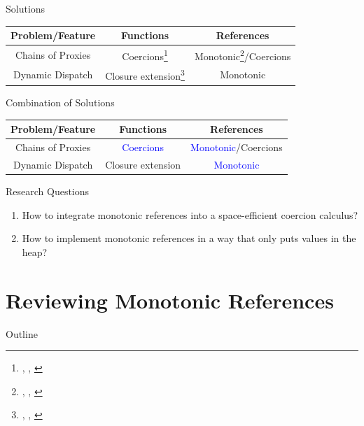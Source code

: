 \documentclass[12pt,dvipsnames]{beamer}
\newcommand{\customcite}[1]{\citeauthor{#1}, \citetitle{#1},
  \citeseries{#1} \citeyear{#1}}
\begin{document}
\begin{frame}[fragile]{Solutions}
  \begin{center}
  \begin{tabular}{|c|cc|}
    \hline
    Problem/Feature & Functions & References \\
    \hline
    Chains of Proxies & Coercions\footnote[frame]{\customcite{Siek:2015ab}} & Monotonic\footnote[frame]{\customcite{Siek:2015aa}}/Coercions \\
    Dynamic Dispatch & Closure extension\footnote[frame]{\customcite{Siek:2012uq}} & Monotonic \\
    \hline
  \end{tabular}
\end{center}
\end{frame}

\begin{frame}[fragile]{Combination of Solutions}
  \begin{center}
  \begin{tabular}{|c|cc|}
    \hline
    Problem/Feature & Functions & References \\
    \hline
    Chains of Proxies & \textcolor{blue}{Coercions} & \textcolor{blue}{Monotonic}/Coercions \\
    Dynamic Dispatch & Closure extension & \textcolor{blue}{Monotonic} \\
    \hline
  \end{tabular}
\end{center}
\end{frame}

\begin{frame}[fragile]{Research Questions}
  \begin{center}
\begin{enumerate}
\item How to integrate monotonic references into a space-efficient
  coercion calculus?
\item How to implement monotonic references in a way that only puts
  values in the heap?
\end{enumerate}
\end{center}
\end{frame}

\section{Reviewing Monotonic References}

\begin{frame}{Outline}
  \tableofcontents[currentsection]
\end{frame}
\end{document}
